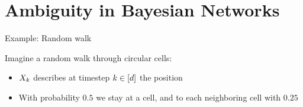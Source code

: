 \documentclass{beamer}
\begin{document}
    {\frame[plain]{\titlepage}}
    \showoutlineatsection


    \section{Ambiguity in Bayesian Networks}

    \begin{frame}{Example: Random walk}
        \begin{minipage}{0.6\linewidth}
            Imagine a random walk through circular cells:
            \begin{itemize}
                \item $X_{k}$ describes at timestep $k\in[d]$ the position
                \item With probability $0.5$ we stay at a cell, and to each neighboring cell with $0.25$
            \end{itemize}
        \end{minipage}
        \begin{minipage}{0.35\linewidth}
        \end{minipage}
        \vspace{0.5cm}


\end{frame}
\end{document}
